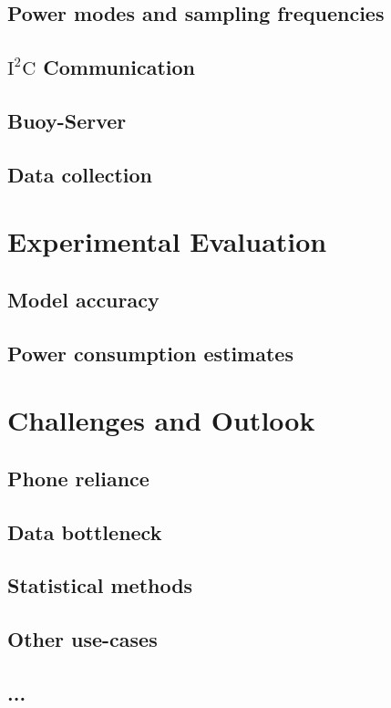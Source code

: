 \documentclass{article}
\begin{document}
\subsection{Power modes and sampling frequencies}

\subsection{$\text{I}^2\text{C}$ Communication}

\subsection{Buoy-Server}

\subsection{Data collection}

\section{Experimental Evaluation}

\subsection{Model accuracy}

\subsection{Power consumption estimates}

\section{Challenges and Outlook}

\subsection{Phone reliance}

\subsection{Data bottleneck}

\subsection{Statistical methods}

\subsection{Other use-cases}

\subsection{...}
\end{document}
